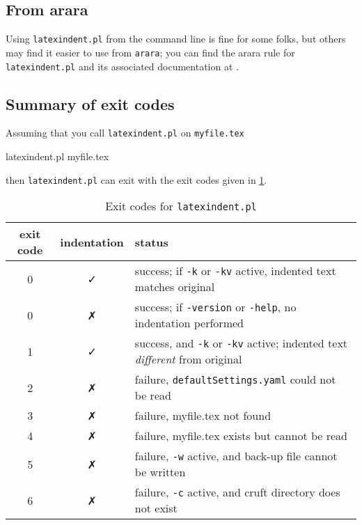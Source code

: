 \subsection{From arara}\label{sec:arara}
	Using \texttt{latexindent.pl} from the command line is fine for some folks, but others
	may find it easier to use from \texttt{arara}; you can find the arara rule for
	\texttt{latexindent.pl} and its associated documentation at \cite{paulo}.

\subsection{Summary of exit codes}
	Assuming that you call \texttt{latexindent.pl} on \texttt{myfile.tex}
	\begin{commandshell}
latexindent.pl myfile.tex
\end{commandshell}
	then \texttt{latexindent.pl} can exit with the exit codes given in \cref{tab:exit-codes}.

	\begin{table}[!htb]
		\caption{Exit codes for \texttt{latexindent.pl}}
		\label{tab:exit-codes}
		\begin{tabular}{ccl}
			\toprule
			exit code & indentation & status                                                                                        \\
			\midrule
			0         & \faCheck    & success; if \texttt{-k} or \texttt{-kv} active, indented text matches original                \\
			0         & \faClose    & success; if \texttt{-version} or \texttt{-help}, no indentation performed                     \\
			1         & \faCheck    & success, and \texttt{-k} or \texttt{-kv} active; indented text \emph{different} from original \\
			\midrule
			2         & \faClose    & failure, \texttt{defaultSettings.yaml} could not be read                                      \\
			3         & \faClose    & failure, myfile.tex not found                                                                 \\
			4         & \faClose    & failure, myfile.tex exists but cannot be read                                                 \\
			5         & \faClose    & failure, \texttt{-w} active, and back-up file cannot be written                               \\
			6         & \faClose    & failure, \texttt{-c} active, and cruft directory does not exist                               \\
			\bottomrule
		\end{tabular}
	\end{table}
